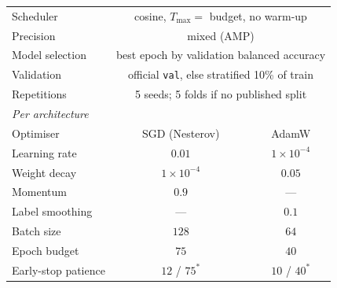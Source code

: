 \begin{table}[t]
\begin{tabular}{lcc}
Scheduler           & \multicolumn{2}{c}{cosine, $T_{\max} =$ budget, no warm-up} \\
Precision           & \multicolumn{2}{c}{mixed (AMP)} \\
Model selection     & \multicolumn{2}{c}{best epoch by validation balanced accuracy} \\
Validation          & \multicolumn{2}{c}{official \texttt{val}, else stratified 10\% of train} \\
Repetitions         & \multicolumn{2}{c}{5 seeds; 5 folds if no published split} \\
\midrule
\multicolumn{3}{l}{\emph{Per architecture}} \\
Optimiser           & SGD (Nesterov)    & AdamW \\
Learning rate       & $0.01$            & $1 \times 10^{-4}$ \\
Weight decay        & $1 \times 10^{-4}$ & $0.05$ \\
Momentum            & $0.9$             & --- \\
Label smoothing     & ---               & $0.1$ \\
Batch size          & $128$             & $64$ \\
Epoch budget        & $75$              & $40$ \\
Early-stop patience & $12$ / $75^{*}$   & $10$ / $40^{*}$ \\
\bottomrule
\end{tabular}
\end{table}
